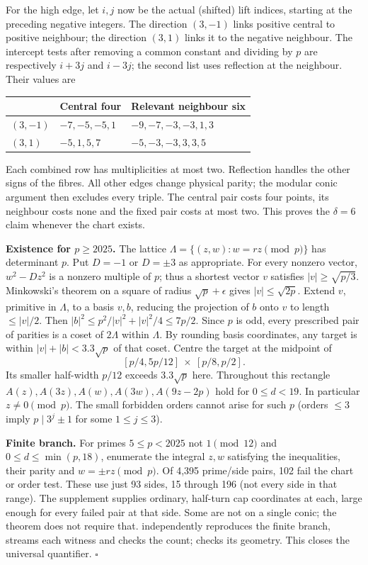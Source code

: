 \documentclass[10pt]{article}
\begin{document}
For the high edge, let $i,j$ now be the actual (shifted) lift indices, starting at the preceding negative integers. The direction $(3,-1)$ links positive central to positive neighbour; the direction $(3,1)$ links it to the negative neighbour. The intercept tests after removing a common constant and dividing by $p$ are respectively $i+3j$ and $i-3j$; the second list uses reflection at the neighbour. Their values are
\begin{center}\begin{tabular}{lll}\toprule & Central four & Relevant neighbour six\\\midrule
$(3,-1)$ & $-7,-5,-5,1$ & $-9,-7,-3,-3,1,3$\\$(3,1)$ & $-5,1,5,7$ & $-5,-3,-3,3,3,5$\\\bottomrule\end{tabular}\end{center}
Each combined row has multiplicities at most two. Reflection handles the other signs of the fibres. All other edges change physical parity; the modular conic argument then excludes every triple. The central pair costs four points, its neighbour costs none and the fixed pair costs at most two. This proves the $\delta=6$ claim whenever the chart exists.

\textbf{Existence for $p\ge2025$.} The lattice $\Lambda=\{(z,w):w=rz\pmod p\}$ has determinant $p$. Put $D=-1$ or $D=\pm3$ as appropriate. For every nonzero vector, $w^2-Dz^2$ is a nonzero multiple of $p$; thus a shortest vector $v$ satisfies $|v|\ge\sqrt{p/3}$. Minkowski's theorem on a square of radius $\sqrt p+\epsilon$ gives $|v|\le\sqrt{2p}$. Extend $v$, primitive in $\Lambda$, to a basis $v,b$, reducing the projection of $b$ onto $v$ to length $\le |v|/2$. Then $|b|^2\le p^2/|v|^2+|v|^2/4\le7p/2$. Since $p$ is odd, every prescribed pair of parities is a coset of $2\Lambda$ within $\Lambda$. By rounding basis coordinates, any target is within $|v|+|b|<3.3\sqrt p$ of that coset. Centre the target at the midpoint of
\[
 [p/4,5p/12]\ \times\ [p/8,p/2].
\]
Its smaller half-width $p/12$ exceeds $3.3\sqrt p$ here. Throughout this rectangle $A(z),A(3z),A(w),A(3w),A(9z-2p)$ hold for $0\le d<19$. In particular $z\ne0\pmod p$. The small forbidden orders cannot arise for such $p$ (orders $\le3$ imply $p\mid3^j\pm1$ for some $1\le j\le3$).

\textbf{Finite branch.} For primes $5\le p<2025$ not $1\pmod{12}$ and $0\le d\le\min(p,18)$, enumerate the integral $z,w$ satisfying the inequalities, their parity and $w=\pm rz\pmod p$. Of 4,395 prime/side pairs, 102 fail the chart or order test. These use just 93 sides, 15 through 196 (not every side in that range). The supplement supplies ordinary, half-turn cap coordinates at each, large enough for every failed pair at that side. Some are not on a single conic; the theorem does not require that.  independently reproduces the finite branch, streams each witness and checks the count;  checks its geometry. This closes the universal quantifier. \hfill$\square$
\end{document}
